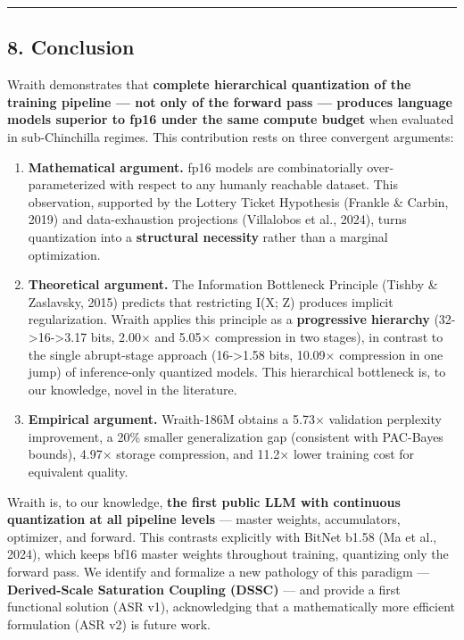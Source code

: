 \begin{center}\rule{0.5\linewidth}{0.5pt}\end{center}

\subsection{8. Conclusion}\label{conclusion}

Wraith demonstrates that \textbf{complete hierarchical quantization of
the training pipeline --- not only of the forward pass --- produces
language models superior to fp16 under the same compute budget} when
evaluated in sub-Chinchilla regimes. This contribution rests on three
convergent arguments:

\begin{enumerate}
\def\labelenumi{\arabic{enumi}.}
\item
  \textbf{Mathematical argument.} fp16 models are combinatorially
  over-parameterized with respect to any humanly reachable dataset. This
  observation, supported by the Lottery Ticket Hypothesis (Frankle \&
  Carbin, 2019) and data-exhaustion projections (Villalobos et al.,
  2024), turns quantization into a \textbf{structural necessity} rather
  than a marginal optimization.
\item
  \textbf{Theoretical argument.} The Information Bottleneck Principle
  (Tishby \& Zaslavsky, 2015) predicts that restricting I(X; Z) produces
  implicit regularization. Wraith applies this principle as a
  \textbf{progressive hierarchy} (32->16->3.17 bits, 2.00× and 5.05×
  compression in two stages), in contrast to the single abrupt-stage
  approach (16->1.58 bits, 10.09× compression in one jump) of
  inference-only quantized models. This hierarchical bottleneck is, to
  our knowledge, novel in the literature.
\item
  \textbf{Empirical argument.} Wraith-186M obtains a 5.73× validation
  perplexity improvement, a 20\% smaller generalization gap (consistent
  with PAC-Bayes bounds), 4.97× storage compression, and 11.2× lower
  training cost for equivalent quality.
\end{enumerate}

Wraith is, to our knowledge, \textbf{the first public LLM with
continuous quantization at all pipeline levels} --- master weights,
accumulators, optimizer, and forward. This contrasts explicitly with
BitNet b1.58 (Ma et al., 2024), which keeps bf16 master weights
throughout training, quantizing only the forward pass. We identify and
formalize a new pathology of this paradigm --- \textbf{Derived-Scale
Saturation Coupling (DSSC)} --- and provide a first functional solution
(ASR v1), acknowledging that a mathematically more efficient formulation
(ASR v2) is future work.

